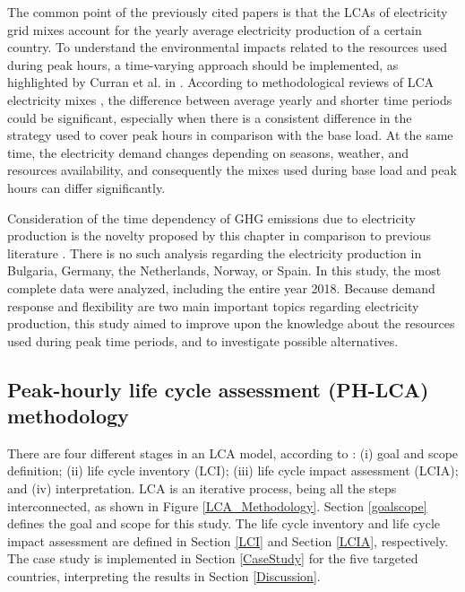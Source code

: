 {{The common point of the previously cited papers is that the LCAs of electricity grid mixes account for the yearly average electricity production of a certain country. To understand  the environmental impacts related to the resources used during peak hours, a time-varying approach should be implemented, as highlighted by Curran et al. in \cite{CURRAN2005}.} 
{According to methodological reviews of LCA electricity mixes \cite{Soimakallio2011,Turconi2013LifeLimitations}, the difference between average yearly and shorter time periods could be significant, especially when there is a consistent difference in the strategy used to cover peak hours in comparison with the base load. At the same time, the electricity demand changes depending on seasons, weather, and resources availability, and consequently the mixes used  during base load and peak hours can differ significantly.}

{Consideration of the time dependency of GHG emissions due to electricity production is the novelty proposed by this chapter in comparison to previous literature \cite{Garcia-Gusano2017, Lund2010EnergyLCA, Jones2017AnGeneration, Thomson2017MarginalBritain, Howard2017CurrentCity, Garcia2014, Garcia2016MarginalVehicles, Moro2017}}. There is no such analysis regarding the electricity production in Bulgaria, Germany, the Netherlands, Norway, or Spain. In this study, the most complete data were analyzed, including the entire year 2018. Because demand response and flexibility are two main important topics regarding electricity production, this study aimed to improve upon the knowledge about the resources used during peak time periods, and to investigate possible alternatives. 

\subsection{Peak-hourly life cycle assessment (PH-LCA) methodology}


There are four different stages in an LCA model, according to \cite{2006ISOGuidelines, 2006ISOFramework}: (i) goal and scope definition; (ii) life cycle inventory (LCI); (iii) life cycle impact assessment (LCIA); and (iv) interpretation. LCA is an iterative process, being all the steps interconnected, as shown in Figure \ref{LCA_Methodology}. Section \ref{goalscope} defines the goal and scope for this study. The life cycle inventory and life cycle impact assessment are defined in Section \ref{LCI} and Section \ref{LCIA}, respectively. The case study is implemented in Section \ref{CaseStudy} for the five targeted countries, interpreting the results in Section \ref{Discussion}.  

}
